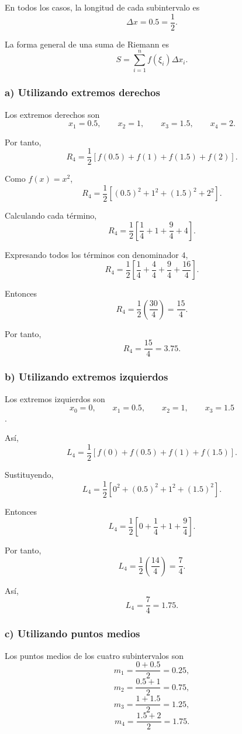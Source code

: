 \documentclass[12pt]{article}
\begin{document}
En todos los casos, la longitud de cada subintervalo es
\[
\Delta x=0.5=\frac12.
\]

La forma general de una suma de Riemann es
\[
S=\sum_{i=1}^{n}f(\xi_i)\Delta x_i.
\]

\subsubsection*{a) Utilizando extremos derechos}
Los extremos derechos son
\[
x_1=0.5,\qquad x_2=1,\qquad x_3=1.5,\qquad x_4=2.
\]

Por tanto,
\[
R_4
=
\frac12
\left[
f(0.5)+f(1)+f(1.5)+f(2)
\right].
\]

Como \(f(x)=x^2\),
\[
R_4
=
\frac12
\left[
(0.5)^2+1^2+(1.5)^2+2^2
\right].
\]

Calculando cada término,
\[
R_4
=
\frac12
\left[
\frac14+1+\frac94+4
\right].
\]

Expresando todos los términos con denominador \(4\),
\[
R_4
=
\frac12
\left[
\frac14+\frac44+\frac94+\frac{16}{4}
\right].
\]

Entonces
\[
R_4
=
\frac12
\left(
\frac{30}{4}
\right)
=
\frac{15}{4}.
\]

Por tanto,
\[
\boxed{R_4=\frac{15}{4}=3.75}.
\]

\subsubsection*{b) Utilizando extremos izquierdos}
Los extremos izquierdos son \[x_0=0,\qquad x_1=0.5,\qquad x_2=1,\qquad x_3=1.5\].

Así,
\[
L_4
=
\frac12
\left[
f(0)+f(0.5)+f(1)+f(1.5)
\right].
\]

Sustituyendo,
\[
L_4
=
\frac12
\left[
0^2+(0.5)^2+1^2+(1.5)^2
\right].
\]

Entonces
\[
L_4
=
\frac12
\left[
0+\frac14+1+\frac94
\right].
\]

Por tanto,
\[
L_4
=
\frac12
\left(
\frac{14}{4}
\right)
=
\frac{7}{4}.
\]

Así,
\[
\boxed{L_4=\frac74=1.75}.
\]

\subsubsection*{c) Utilizando puntos medios}
Los puntos medios de los cuatro subintervalos son
\[
m_1=\frac{0+0.5}{2}=0.25,
\]
\[
m_2=\frac{0.5+1}{2}=0.75,
\]
\[
m_3=\frac{1+1.5}{2}=1.25,
\]
\[
m_4=\frac{1.5+2}{2}=1.75.
\]
\end{document}

